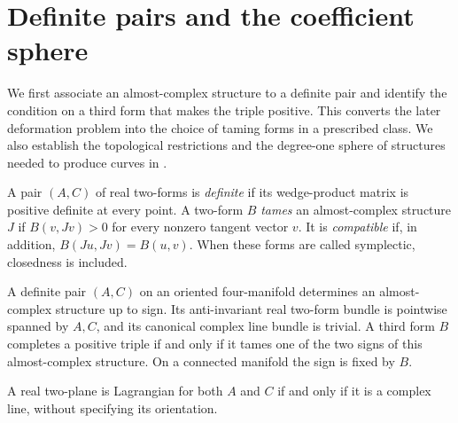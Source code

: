 \section{Definite pairs and the coefficient sphere}\label{sec:definite-pairs}

We first associate an almost-complex structure to a definite pair and
identify the condition on a third form that makes the triple positive.
This converts the later deformation problem into the choice of taming
forms in a prescribed class. We also establish the topological
restrictions and the degree-one sphere of structures needed to produce
curves in .

\begin{definition}
A pair $(A,C)$ of real two-forms is \emph{definite} if its wedge-product
matrix is positive definite at every point. A two-form $B$ \emph{tames}
an almost-complex structure $J$ if $B(v,Jv)>0$ for every nonzero tangent
vector $v$. It is \emph{compatible} if, in addition,
$B(Ju,Jv)=B(u,v)$. When these forms are called symplectic, closedness is
included.
\end{definition}

\begin{lemma}\label{lem:definite-pair}
A definite pair $(A,C)$ on an oriented four-manifold determines an
almost-complex structure up to sign. Its anti-invariant real two-form
bundle is pointwise spanned by $A,C$, and its canonical complex line
bundle is trivial. A third form $B$ completes a positive triple if and
only if it tames one of the two signs of this almost-complex structure.
On a connected manifold the sign is fixed by $B$.

A real two-plane is Lagrangian for both $A$ and $C$ if and only if it is
a complex line, without specifying its orientation.
\end{lemma}

